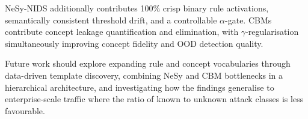 \documentclass[conference]{IEEEtran}
\begin{document}
NeSy-NIDS additionally contributes 100\% crisp binary rule activations,
semantically consistent threshold drift, and a controllable $\alpha$-gate.
CBMs contribute concept leakage quantification and elimination, with
$\gamma$-regularisation simultaneously improving concept fidelity and OOD
detection quality.

Future work should explore expanding rule and concept vocabularies through
data-driven template discovery, combining NeSy and CBM bottlenecks in a
hierarchical architecture, and investigating how the findings generalise to
enterprise-scale traffic where the ratio of known to unknown attack classes
is less favourable.



\end{document}
